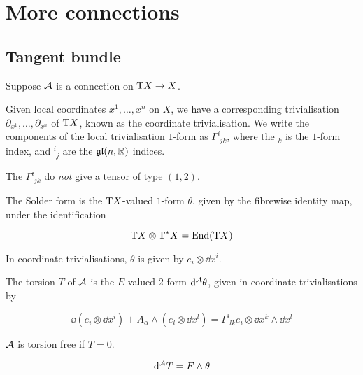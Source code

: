 \section{More connections}

\subsection{Tangent bundle}

Suppose \(\mathcal{A}\) is a connection on \(\mathrm{T} X \to X\).

\begin{definition}

    Given local coordinates \(x^1, \dots, x^n\) on \(X\), we have a corresponding trivialisation \(\partial_{x^1}, \dots, \partial_{x^n}\) of \(\mathrm{T} X\), known as the coordinate trivialisation. We write the components of the local trivialisation \(1\)-form as \(\Gamma^i_{\phantom{i}jk}\), where the \({}_k\) is the \(1\)-form index, and \({}^i_{\phantom ij}\) are the \(\mathfrak{g}\mathfrak{l}(n, \mathbb{R})\) indices.
\end{definition}

\begin{remark}
    The \(\Gamma^i_{\phantom ijk}\) do \emph{not} give a tensor of type \((1, 2)\).
\end{remark}

\begin{definition}
     The Solder form is the \(\mathrm{T} X\)-valued \(1\)-form \(\theta\), given by the fibrewise identity map, under the identification
    
    \[\mathrm{T} X \otimes \mathrm{T}^* X = \operatorname{End}(\mathrm{T} X)\]

    In coordinate trivialisations, \(\theta\) is given by \(e_i \otimes \dd x^i\).
\end{definition}

\begin{definition}
    [torsion] The torsion \(T\) of \(\mathcal{A}\) is the \(E\)-valued \(2\)-form \(\dd^{\mathcal{A}}\theta\), given in coordinate trivialisations by

    \[\dd(e_i \otimes \dd x^i) + A_\alpha \wedge (e_l \otimes \dd x^l) = \Gamma^{i}_{\phantom i lk}e_i\otimes \dd x^k \wedge \dd x^l\]

    \(\mathcal{A}\) is torsion free if \(T = 0\).
\end{definition}

\begin{proposition}

    \[\dd^{\mathcal{A}} T = F\wedge\theta\]
\end{proposition}

